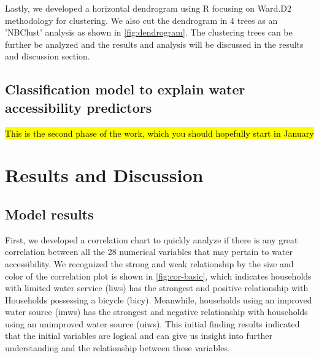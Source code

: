 \documentclass[10pt,twoside]{article}
\numberwithin{equation}{section}
\newcommand{\?}{\stackrel{?}{=}}
\begin{document}
Lastly, we developed a horizontal dendrogram using R focusing on Ward.D2 methodology for clustering. We also cut the dendrogram in 4 trees as an 'NBClust' analysis as shown in \autoref{fig:dendrogram}. The clustering trees can be further be analyzed and the results and analysis will be discussed in the results and discussion section. 



\subsection*{Classification model to explain water accessibility predictors}
\hl{This is the second phase of the work, which you should hopefully start in January}


\section*{Results and Discussion}

\subsection*{Model results}
First, we developed a correlation chart to quickly analyze if there is any great correlation between all the 28 numerical variables that may pertain to water accessibility. We recognized the strong and weak relationship by the size and color of the correlation plot is shown in \autoref{fig:cor-basic}, which indicates households with limited water service (liws) has the strongest and positive relationship with Households possessing a bicycle (bicy). Meanwhile, households using an improved water source (imws) has the strongest and negative relationship with households using an unimproved water source (uiws). This initial finding results indicated that the initial variables are logical and can give us insight into further understanding and the relationship between these variables. 
\end{document}
